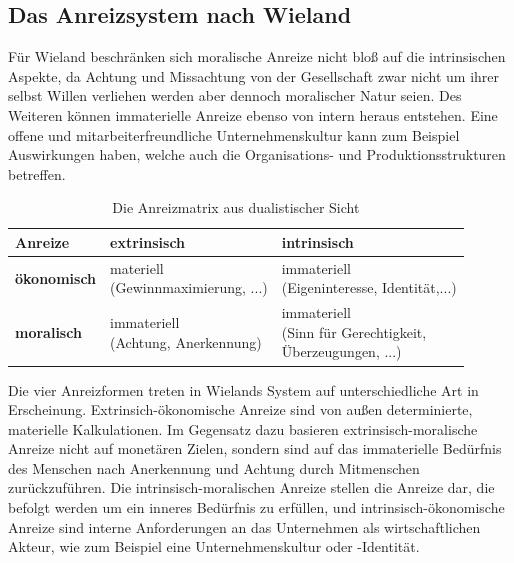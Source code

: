 \documentclass[12pt]{article}
\begin{document}
\subsection{Das Anreizsystem nach Wieland}
Für Wieland beschränken sich moralische Anreize nicht bloß auf die intrinsischen Aspekte, da Achtung und Missachtung von der Gesellschaft zwar nicht um ihrer selbst Willen verliehen werden aber dennoch moralischer Natur seien. Des Weiteren können immaterielle Anreize ebenso von intern heraus entstehen. Eine offene und mitarbeiterfreundliche Unternehmenskultur kann zum Beispiel Auswirkungen haben, welche auch die Organisations- und Produktionsstrukturen betreffen.
\FloatBarrier
\begin{table}[ht!]
\begin{tabular}{|p{3cm}|p{5cm}|p{5cm}|}
\hline
Anreize & \textbf{extrinsisch} & \textbf{intrinsisch}\\\hline
\textbf{ökonomisch} & \makecell[lt]{materiell\\(Gewinnmaximierung, ...)} & \makecell[lt]{immateriell\\ (Eigeninteresse, Identität,...)}\\\hline
\textbf{moralisch} & \makecell[lt]{immateriell\\(Achtung, Anerkennung)} & \makecell[lt]{immateriell\\(Sinn für Gerechtigkeit,\\Überzeugungen, ...)}\\\hline
\end{tabular}
\caption{Die Anreizmatrix aus dualistischer Sicht}
\end{table}
\FloatBarrier
\noindent Die vier Anreizformen treten in Wielands System auf unterschiedliche Art in Erscheinung. Extrinsich-ökonomische Anreize sind von außen determinierte, materielle Kalkulationen. Im Gegensatz dazu basieren extrinsisch-moralische Anreize nicht auf monetären Zielen, sondern sind auf das immaterielle Bedürfnis des Menschen nach Anerkennung und Achtung durch Mitmenschen zurückzuführen. Die intrinsisch-moralischen Anreize stellen die Anreize dar, die befolgt werden um ein inneres Bedürfnis zu erfüllen, und intrinsisch-ökonomische Anreize sind interne Anforderungen an das Unternehmen als wirtschaftlichen Akteur, wie zum Beispiel eine Unternehmenskultur oder -Identität.
\end{document}
